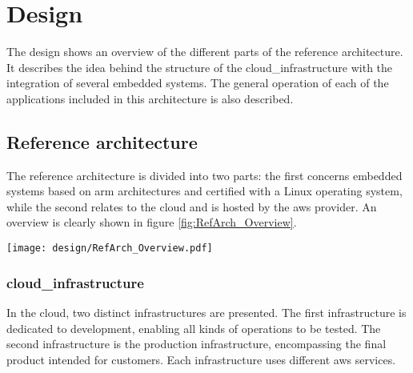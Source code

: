 

\chapter{Design}
\label{chap:design}

The design shows an overview of the different parts of the reference architecture. It describes the idea behind the structure of the \gls{cloud_infrastructure} with the integration of several embedded systems. The general operation of each of the applications included in this architecture is also described.

\minitoc
\newpage

\section{Reference architecture}

The reference architecture is divided into two parts: the first concerns embedded systems based on \gls{arm} architectures and certified  with a Linux operating system, while the second relates to the \gls{cloud} and is hosted by the \gls{aws} provider. An overview is clearly shown in figure \ref{fig:RefArch_Overview}.
\begin{center}
    \begingroup
    \texttt{[image: design/RefArch\_Overview.pdf]}
    \label{fig:RefArch_Overview}
    \endgroup
\end{center}

\subsection{\Gls{cloud_infrastructure}}
In the \gls{cloud}, two distinct infrastructures are presented. The first infrastructure is dedicated to development, enabling all kinds of operations to be tested. The second infrastructure is the production infrastructure, encompassing the final product intended for customers. Each infrastructure uses different \gls{aws} services.

